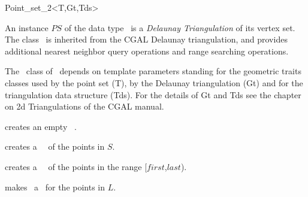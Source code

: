 \begin{ccRefClass}{Point_set_2<T,Gt,Tds>}

\ccDefinition


An instance $PS$ of the data type \ccRefName\  is a {\em Delaunay Triangulation}
of its vertex set. The class \ccRefName\ is inherited from the CGAL Delaunay triangulation,
and provides additional nearest neighbor query operations and range searching operations.

The \ccRefName\ class of \cgal\ depends on template parameters standing for the
geometric traits classes used by the point set (T), by the Delaunay triangulation (Gt)
and for the triangulation data structure (Tds). 
For the details of Gt and Tds see the chapter on 2d Triangulations of the CGAL manual.




\ccHtmlLinksOff


\ccTypes
{}
\ccThreeToTwo
{}

\ccHtmlLinksOn


\ccCreation

{creates an empty \ccRefName\ .}

{creates a \ccRefName\ \ccVar\ of the points in $S$. 
}

{creates a \ccRefName\ \ccVar\ of the points in the range
[$first$,$last$).}


\ccOperations

{ makes \ccVar\ a \ccRefName\ for the points in $L$.}


\end{ccRefClass}
